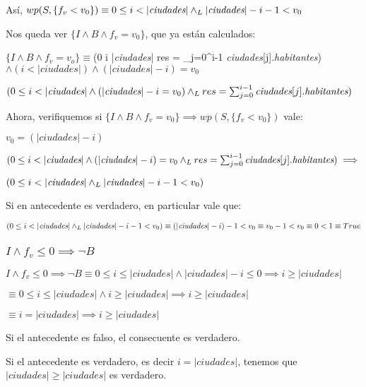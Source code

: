 \documentclass[10pt,a4paper]{article}
\newcommand{\ciu}{
\textit{ciudades}
}
\newcommand{\hab}{
\textit{habitantes}
}
\newcommand{\invariante}{
    $(0 \leq i \leq |\textit{ciudades}| \yLuego res = \sum_{j=0}^{i-1} \textit{ciudades}[j].\textit{habitantes})$}
\newcommand{\B}{
    (i < |\ciu|)
}
\newcommand{\fvariante}{
    (|\ciu| - i)
}
\begin{document}
Así, $wp(S,\{f_v<v_0\}) \equiv 0 \leq i < |\ciu| \yLuego |\ciu|- i - 1<v_0$

\vspace{4mm}

Nos queda ver $\{I \land B \land f_v = v_0\}$, que ya están calculados:

$\{I \land B \land f_v = v_o\} \equiv \invariante \land \B \land \fvariante = v_0$

\hspace*{2.7cm} \equiv $(0 \leq i < |\ciu| \land (|\ciu| - i = v_0) \yLuego res = \sum_{j=0}^{i-1}\ciu[j].\hab)$

\vspace{4mm}

Ahora, verifiquemos si $\{I \land B \land f_v = v_0\} \implies wp(S,\{f_v<v_0\})$ vale:

\vspace{2mm}
$v_0 = \fvariante$


\vspace{4mm}

$(0 \leq i < |\ciu| \land \fvariante = v_0 \yLuego res = \sum_{j=0}^{i-1}\ciu[j].\hab) \implies$

$ (0 \leq i < |\ciu| \yLuego |\ciu| -i-1 < v_0)$

\vspace{2mm}

Si en antecedente es verdadero, en particular vale que:

$(0 \leq i < |\ciu| \yLuego |\ciu| -i-1 < v_0) \equiv (|\ciu| - i) - 1 < v_0 \equiv v_0 - 1 < v_0 \equiv 0 < 1 \equiv True$ \checkmark  

\subsubsection{$I \land f_v \leq 0 \implies \lnot B$}

$I \land f_v \leq 0 \implies \lnot B \equiv 0 \leq i \leq |\ciu| \land |\ciu| - i \leq 0 \implies i \geq |\ciu|$

\hspace{3.13cm}$\equiv 0 \leq i \leq |\ciu| \land i \geq |\ciu| \implies i \geq |\ciu|$

\hspace{3.13cm}$\equiv i = |\ciu| \implies i \geq |\ciu|$ 

\vspace{2mm}

Si el antecedente es falso, el consecuente es verdadero.

Si el antecedente es verdadero, es decir $i=|\ciu|$, tenemos que $|\ciu| \geq |\ciu|$ es verdadero.
\end{document}
